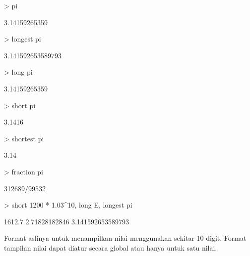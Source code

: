\documentclass{report}
\begin{document}
\begin{eulernotebook}
\begin{eulercomment}
\begin{eulercomment}
\begin{eulercomment}
\end{eulercomment}
\begin{eulerprompt}
> pi
\end{eulerprompt}
\begin{euleroutput}
  3.14159265359
\end{euleroutput}
\begin{eulerprompt}
> longest pi
\end{eulerprompt}
\begin{euleroutput}
        3.141592653589793 
\end{euleroutput}
\begin{eulerprompt}
> long pi
\end{eulerprompt}
\begin{euleroutput}
  3.14159265359
\end{euleroutput}
\begin{eulerprompt}
> short pi
\end{eulerprompt}
\begin{euleroutput}
  3.1416
\end{euleroutput}
\begin{eulerprompt}
> shortest pi
\end{eulerprompt}
\begin{euleroutput}
       3.14 
\end{euleroutput}
\begin{eulerprompt}
> fraction pi
\end{eulerprompt}
\begin{euleroutput}
  312689/99532
\end{euleroutput}
\begin{eulerprompt}
> short 1200 * 1.03^10, long E, longest pi
\end{eulerprompt}
\begin{euleroutput}
  1612.7
  2.71828182846
        3.141592653589793 
\end{euleroutput}
\begin{eulercomment}
Format aslinya untuk menampilkan nilai menggunakan sekitar 10 digit.
Format tampilan nilai dapat diatur secara global atau hanya untuk satu
nilai.


\end{eulercomment}
\end{eulercomment}
\end{eulercomment}
\end{eulernotebook}
\end{document}
